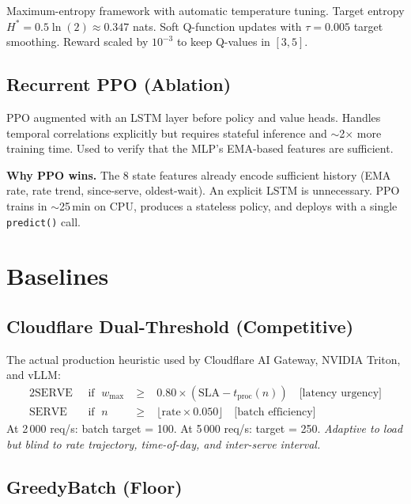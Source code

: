 \documentclass[11pt,a4paper]{article}
\begin{document}
Maximum-entropy framework with automatic temperature tuning.
Target entropy $H^* = 0.5\ln(2) \approx 0.347$ nats.
Soft Q-function updates with $\tau=0.005$ target smoothing.
Reward scaled by $10^{-3}$ to keep Q-values in $[3,5]$.

\subsection{Recurrent PPO (Ablation)}

PPO augmented with an LSTM layer before policy and value heads.
Handles temporal correlations explicitly but requires stateful
inference and $\sim$2$\times$ more training time.
Used to verify that the MLP's EMA-based features are sufficient.

\medskip
\begin{infobox}
\textbf{Why PPO wins.}
The 8 state features already encode sufficient history (EMA rate, rate trend,
since-serve, oldest-wait). An explicit LSTM is unnecessary. PPO trains in
$\sim$25\,min on CPU, produces a stateless policy, and deploys with a
single \texttt{predict()} call.
\end{infobox}

\section{Baselines}

\subsection{Cloudflare Dual-Threshold (Competitive)}

The actual production heuristic used by Cloudflare AI Gateway, NVIDIA Triton,
and vLLM:
\begin{alignat}{2}
  \text{SERVE}&\;\text{ if }\; w_\max &\;\geq\;& 0.80 \times (\text{SLA} - t_\text{proc}(n))
    \quad\text{[latency urgency]}\\
  \text{SERVE}&\;\text{ if }\; n      &\;\geq\;& \lfloor\text{rate} \times 0.050\rfloor
    \quad\text{[batch efficiency]}
\end{alignat}
At 2\,000 req/s: batch target = 100. At 5\,000 req/s: target = 250.
\emph{Adaptive to load but blind to rate trajectory, time-of-day, and
inter-serve interval.}

\subsection{GreedyBatch (Floor)}
\end{document}
